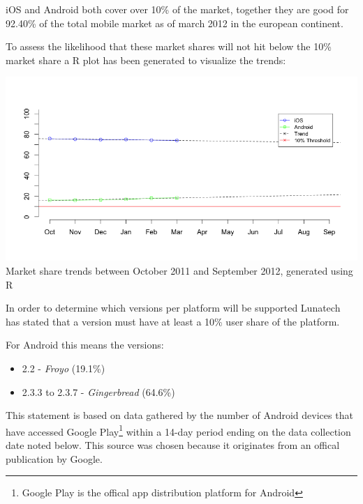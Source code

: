 \noindent iOS and Android both cover over 10\% of the market, together they are good for 92.40\% of the total mobile market as of march 2012 in the european continent. 

To assess the likelihood that these market shares will not hit below the 10\% market share a R plot has been generated to visualize the trends:

 \begin{centering}
 \includegraphics[scale=0.5]{images/platformtrends.png}\\{Market share trends between October 2011 and September 2012, generated using R}\\
 \end{centering}

In order to determine which versions per platform will be supported Lunatech has stated that a version must have at least a 10\% user share of the platform. 

\noindent For Android this means the versions:
\begin{itemize}
\item 2.2 - \emph{Froyo} (19.1\%)
\item 2.3.3 to 2.3.7 - \emph{Gingerbread} (64.6\%)
\end{itemize}
This statement is based on data gathered by the number of Android devices that have accessed Google Play\footnote{Google Play is the offical app distribution platform for Android} within a 14-day period ending on the data collection date noted below. This source was chosen because it originates from an offical publication by Google.\cite{GoogleAndroid2012}

